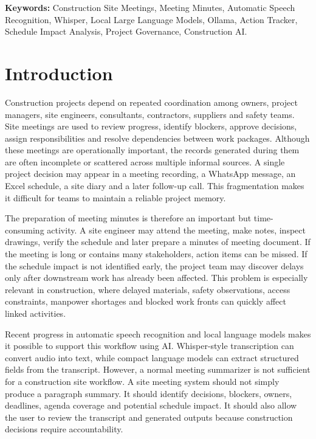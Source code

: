 \documentclass[11pt,a4paper]{article}
\begin{document}
\newpage

\noindent\textbf{Keywords:} Construction Site Meetings, Meeting Minutes, Automatic Speech Recognition, Whisper, Local Large Language Models, Ollama, Action Tracker, Schedule Impact Analysis, Project Governance, Construction AI.

\section{Introduction}

Construction projects depend on repeated coordination among owners, project managers, site engineers, consultants, contractors, suppliers and safety teams. Site meetings are used to review progress, identify blockers, approve decisions, assign responsibilities and resolve dependencies between work packages. Although these meetings are operationally important, the records generated during them are often incomplete or scattered across multiple informal sources. A single project decision may appear in a meeting recording, a WhatsApp message, an Excel schedule, a site diary and a later follow-up call. This fragmentation makes it difficult for teams to maintain a reliable project memory.

The preparation of meeting minutes is therefore an important but time-consuming activity. A site engineer may attend the meeting, make notes, inspect drawings, verify the schedule and later prepare a minutes of meeting document. If the meeting is long or contains many stakeholders, action items can be missed. If the schedule impact is not identified early, the project team may discover delays only after downstream work has already been affected. This problem is especially relevant in construction, where delayed materials, safety observations, access constraints, manpower shortages and blocked work fronts can quickly affect linked activities.

Recent progress in automatic speech recognition and local language models makes it possible to support this workflow using AI. Whisper-style transcription can convert audio into text, while compact language models can extract structured fields from the transcript. However, a normal meeting summarizer is not sufficient for a construction site workflow. A site meeting system should not simply produce a paragraph summary. It should identify decisions, blockers, owners, deadlines, agenda coverage and potential schedule impact. It should also allow the user to review the transcript and generated outputs because construction decisions require accountability.
\end{document}
